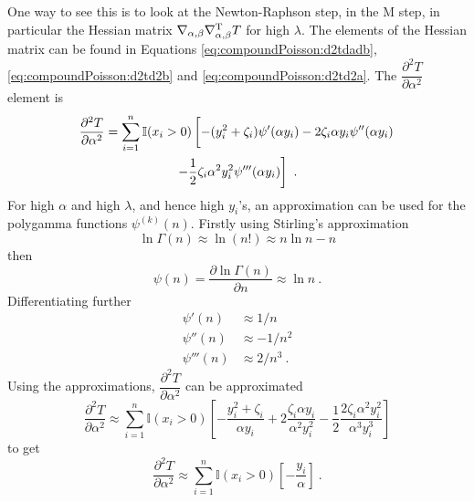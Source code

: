 \documentclass[12pt, a4paper]{memoir}
\newcommand{\T}{^\textup{T}}
\begin{document}
One way to see this is to look at the Newton-Raphson step, in the M step, in particular the Hessian matrix $\nabla_{\alpha,\beta}\nabla_{\alpha,\beta}\T T$ for high $\lambda$. The elements of the Hessian matrix can be found in Equations \eqref{eq:compoundPoisson:d2tdadb}, \eqref{eq:compoundPoisson:d2td2b} and \eqref{eq:compoundPoisson:d2td2a}. The $\dfrac{\partial^2T}{\partial\alpha^2}$ element is 
\begin{multline*}
\frac{\partial^2 T}{\partial \alpha^2} =  \sum_{i=1}^n\mathbb{I}(x_i>0)\left[
	-(y_i^2+\zeta_i)\psi'(\alpha y_i) - 2\zeta_i\alpha y_i\psi''(\alpha y_i)
	\vphantom{\frac{1}{2}}\right.\\\left.	
	-\frac{1}{2}\zeta_i\alpha^2y_i^2\psi'''(\alpha y_i)
\right] \ .
\end{multline*}
For high $\alpha$ and high $\lambda$, and hence high $y_i$'s, an approximation can be used for the polygamma functions $\psi^{(k)}(n)$. Firstly using Stirling's approximation
\begin{equation}
\ln\Gamma(n)\approx\ln(n!)\approx n\ln n-n
\end{equation}
then
\begin{equation}
\psi(n) = \frac{\partial\ln\Gamma(n)}{\partial n} \approx \ln n \ .
\end{equation}
Differentiating further
\begin{align}
\psi'(n) &\approx 1/n \\
\psi''(n) & \approx -1/n^2 \\
\psi'''(n) & \approx 2/n^3 \ .
\end{align}
Using the approximations, $\dfrac{\partial^2T}{\partial\alpha^2}$ can be approximated
\begin{equation*}
\frac{\partial^2 T}{\partial \alpha^2} \approx  \sum_{i=1}^n\mathbb{I}(x_i>0)\left[
	-\frac{y_i^2+\zeta_i}{\alpha y_i} + 2\frac{\zeta_i\alpha y_i}{\alpha^2 y_i^2}
	-\frac{1}{2}\frac{2\zeta_i\alpha^2y_i^2}{\alpha^3 y_i^3}
\right]
\end{equation*}
to get
\begin{equation}
\frac{\partial^2 T}{\partial \alpha^2} \approx  \sum_{i=1}^n\mathbb{I}(x_i>0)\left[
	-\frac{y_i}{\alpha}
\right] \ .
\end{equation}
\end{document}
